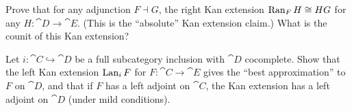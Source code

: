 \begin{exercise}[$\star\star$]
Prove that for any adjunction $F \dashv G$, the right Kan extension $\operatorname{Ran}_F H \cong HG$ for any $H: \cat{D} \to \cat{E}$. (This is the ``absolute'' Kan extension claim.) What is the counit of this Kan extension?
\end{exercise}

\begin{exercise}[$\star\star$]
Let $i: \cat{C} \hookrightarrow \cat{D}$ be a full subcategory inclusion with $\cat{D}$ cocomplete. Show that the left Kan extension $\operatorname{Lan}_i F$ for $F: \cat{C} \to \cat{E}$ gives the ``best approximation'' to $F$ on $\cat{D}$, and that if $F$ has a left adjoint on $\cat{C}$, the Kan extension has a left adjoint on $\cat{D}$ (under mild conditions).
\end{exercise}

